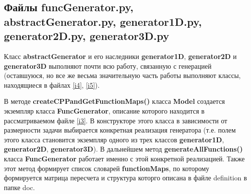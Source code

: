 \documentclass[a4paper]{article}
\begin{document}
\subsection{\Large Файлы funcGenerator.py, abstractGenerator.py, generator1D.py, generator2D.py, generator3D.py}
Класс {\bf abstractGenerator} и его наследники {\bf generator1D}, {\bf generator2D} и {\bf generator3D} выполняют почти всю работу, связанную с генерацией (остав\-шу\-ю\-ся, но все же весьма значительную часть работы выполняют классы, на\-хо\-дя\-щи\-е\-ся в файлах \ref{i4}, \ref{i5}).

В методе {\bf createCPPandGetFunctionMaps()} класса {\bf Model} со\-зда\-ет\-ся экземпляр класса {\bf FuncGenerator}, описание которого находится в рассматриваемом файле \ref{i3}. В конструкторе этого класса в зависимости от размерности задачи выбирается конкретная реализация генератора (т.е. полем этого класса становится экземпляр одного из трех классов {\bf generator1D}, {\bf generator2D}, {\bf generator3D}). В дальнейшем метод {\bf generateAllFunctions()} класса {\bf FuncGenerator} работает именно с этой конкретной реализацией. Также этот метод формирует список словарей {\bf functionMaps}, по которому формируется матрица пересчета и структура которго описана в файле definition в папке doc.
\end{document}
